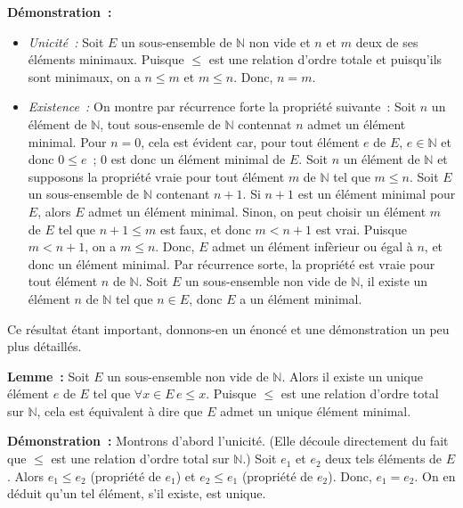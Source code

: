 \noindent\textbf{Démonstration :} 
\begin{itemize}[nosep]
    \item \textit{Unicité :} Soit $E$ un sous-ensemble de $\mathbb{N}$ non vide et $n$ et $m$ deux de ses éléments minimaux. 
        Puisque $\leq$ est une relation d'ordre totale et puisqu'ils sont minimaux, on a $n \leq m$ et $m \leq n$. 
        Donc, $n = m$.
    \item \textit{Existence :} On montre par récurrence forte la propriété suivante : Soit $n$ un élément de $\mathbb{N}$, tout sous-ensemle de $\mathbb{N}$ contennat $n$ admet un élément minimal.
        Pour $n=0$, cela est évident car, pour tout élément $e$ de $E$, $e \in \mathbb{N}$ et donc $0 \leq e$ ; $0$ est donc un élément minimal de $E$.
        Soit $n$ un élément de $\mathbb{N}$ et supposons la propriété vraie pour tout élément $m$ de $\mathbb{N}$ tel que $m \leq n$.
        Soit $E$ un sous-ensemble de $\mathbb{N}$ contenant $n+1$.
        Si $n+1$ est un élément minimal pour $E$, alors $E$ admet un élément minimal. 
        Sinon, on peut choisir un élément $m$ de $E$ tel que $n+1 \leq m$ est faux, et donc $m < n+1$ est vrai.
        Puisque $m < n+1$, on a $m \leq n$.
        Donc, $E$ admet un élément infèrieur ou égal à $n$, et donc un élément minimal.
        Par récurrence sorte, la propriété est vraie pour tout élément $n$ de $\mathbb{N}$.
        Soit $E$ un sous-ensemble non vide de $\mathbb{N}$, il existe un élément $n$ de $\mathbb{N}$ tel que $n \in E$, donc $E$ a un élément minimal. 
\end{itemize} 

\done

\medskip

Ce résultat étant important, donnons-en un énoncé et une démonstration un peu plus détaillés.

\medskip

\noindent\textbf{Lemme :} Soit $E$ un sous-ensemble non vide de $\mathbb{N}$. 
    Alors il existe un unique élément $e$ de $E$ tel que $\forall x \in E \, e \leq x$. 
    Puisque $\leq$ est une relation d'ordre total sur $\mathbb{N}$, cela est équivalent à dire que $E$ admet un unique élément minimal. 

\medskip

\noindent\textbf{Démonstration :} 
    Montrons d'abord l'unicité. 
    (Elle découle directement du fait que $\leq$ est une relation d'ordre total sur $\mathbb{N}$.)
    Soit $e_1$ et $e_2$ deux tels éléments de $E$. 
    Alors $e_1 \leq e_2$ (propriété de $e_1$) et $e_2 \leq e_1$ (propriété de $e_2$). 
    Donc, $e_1 = e_2$. 
    On en déduit qu'un tel élément, s'il existe, est unique. 

